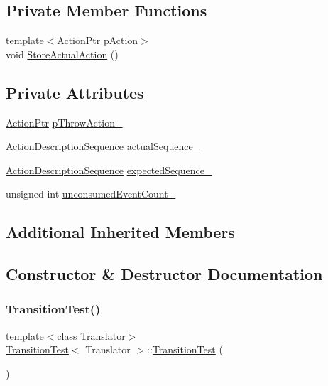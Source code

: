 \subsection*{Private Member Functions}
\begin{DoxyCompactItemize}
\item 
{\footnotesize template$<$Action\+Ptr p\+Action$>$ }\\void \mbox{\hyperlink{struct_transition_test_a8472d08be7c0daef4353e7d4b3f36a08}{Store\+Actual\+Action}} ()
\end{DoxyCompactItemize}
\subsection*{Private Attributes}
\begin{DoxyCompactItemize}
\item 
\mbox{\hyperlink{_transition_test_8cpp_a15abe0c263cd39ad777035499160b924}{Action\+Ptr}} \mbox{\hyperlink{struct_transition_test_a6008df970497b77425b4b0f0a45bb2f6}{p\+Throw\+Action\+\_\+}}
\item 
\mbox{\hyperlink{_transition_test_8cpp_a3a9d02400db74004cfbb7c1777a1e17a}{Action\+Description\+Sequence}} \mbox{\hyperlink{struct_transition_test_a224815ec84366d59a1265a4dd87f9fbb}{actual\+Sequence\+\_\+}}
\item 
\mbox{\hyperlink{_transition_test_8cpp_a3a9d02400db74004cfbb7c1777a1e17a}{Action\+Description\+Sequence}} \mbox{\hyperlink{struct_transition_test_a7f392f4d108f5d692be49186b9d1c6e1}{expected\+Sequence\+\_\+}}
\item 
unsigned int \mbox{\hyperlink{struct_transition_test_a69a4adaab96ad9695f9023243cf66ecb}{unconsumed\+Event\+Count\+\_\+}}
\end{DoxyCompactItemize}
\subsection*{Additional Inherited Members}


\subsection{Constructor \& Destructor Documentation}
\mbox{\label{struct_transition_test_afb3b0812fffeb0ecf9fd5de9f87e06ef}} 
\subsubsection{\texorpdfstring{Transition\+Test()}{TransitionTest()}}
{\footnotesize\ttfamily template$<$class Translator$>$ \\
\mbox{\hyperlink{struct_transition_test}{Transition\+Test}}$<$ Translator $>$\+::\mbox{\hyperlink{struct_transition_test}{Transition\+Test}} (\begin{DoxyParamCaption}{ }\end{DoxyParamCaption})\hspace{0.3cm}{\ttfamily [inline]}}

